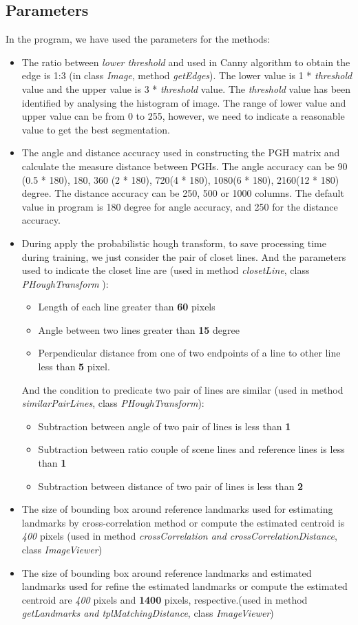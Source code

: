 \subsection{Parameters}
In the program, we have used the parameters for the methods:
\begin{itemize}
\item The ratio between \textit{lower threshold} and  used in Canny algorithm to obtain the edge is 1:3 (in class \textit{Image}, method \textit{getEdges}). The lower value is 1 * \textit{threshold} value and the upper value is 3 * \textit{threshold} value. The \textit{threshold} value has been identified by analysing the histogram of image. The range of lower value and upper value can be from 0 to 255, however, we need to indicate a reasonable value to get the best segmentation.
\item The angle and distance accuracy used in constructing the PGH matrix and calculate the measure distance between PGHs. The angle accuracy can be 90 (0.5 * 180), 180, 360 (2 * 180), 720(4 * 180), 1080(6 * 180), 2160(12 * 180) degree. The distance accuracy can be 250, 500 or 1000 columns. The default value in program is 180 degree for angle accuracy, and 250 for the distance accuracy. 
\item During apply the probabilistic hough transform, to save processing time during training, we just consider the pair of closet lines. And the parameters used to indicate the closet line are (used in method \textit{closetLine}, class \textit{PHoughTransform} ):
	\begin{itemize}
		\item Length of each line greater than \textbf{60} pixels
		\item Angle between two lines greater than \textbf{15} degree
		\item Perpendicular distance from one of two endpoints of a line to other line less than \textbf{5} pixel.
	\end{itemize}
And the condition to predicate two pair of lines are similar (used in method \textit{similarPairLines}, class \textit{PHoughTransform}):
	\begin{itemize}
		\item Subtraction between angle of two pair of lines is less than \textbf{1}
		\item Subtraction between ratio couple of scene lines and reference lines is less than \textbf{1}
		\item Subtraction between distance of two pair of lines is less than \textbf{2}
	\end{itemize}
\item The size of bounding box around reference landmarks used for estimating landmarks by cross-correlation method or compute the estimated centroid is \textit{400} pixels (used in method \textit{crossCorrelation and crossCorrelationDistance}, class \textit{ImageViewer})
\item The size of bounding box around reference landmarks and estimated landmarks used for refine the estimated landmarks or compute the estimated centroid are \textit{400} pixels and \textbf{1400} pixels, respective.(used in method \textit{getLandmarks and tplMatchingDistance}, class \textit{ImageViewer})
\end{itemize}
